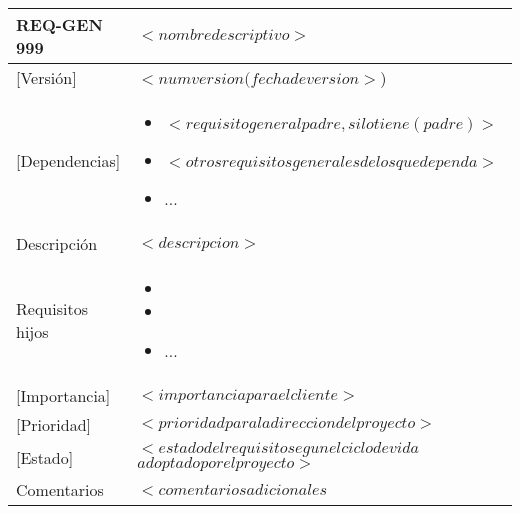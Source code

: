  \begin{Artefacto}[H]
    \centering
    \begin{tabular}{|p{3cm}|p{10cm}|}
        \hline
         \cellcolor{gray30}  REQ-GEN 999	&  $<nombre descriptivo>$\\ 
        \hline
         \cellcolor{gray30}  [Versión]	&  $<num version(fecha de version>$)\\   
         \hline
         \cellcolor{gray30}  [Dependencias] &  	\begin{itemize} 	\item $<requisito general padre, si lo tiene (padre)>$
\item $<otros requisitos generales de los que dependa>$
\item	... \end{itemize}\\  
        \hline
         \cellcolor{gray30} Descripción	& $<descripcion>$  \\
          \hline
         \cellcolor{gray30}  Requisitos hijos&  	\begin{itemize} 	\item  
\item 
\item	... \end{itemize}\\  
        \hline          
           \cellcolor{gray30}[Importancia]	& $<importancia para el cliente>$  \\
         \hline
         \cellcolor{gray30}  [Prioridad] &  	$<prioridad para la direccion del proyecto>$\\
         \hline
         \cellcolor{gray30}  [Estado]	&$<estado del requisito segun el ciclo de vida $ $ adoptado por el proyecto>$\\   
        \hline       
         \cellcolor{gray30}  Comentarios	&$<comentarios adicionales $\\   
        \hline
  

\end{tabular}
\end{Artefacto}
